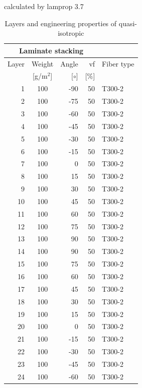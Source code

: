 \documentclass[a4paper,landscape,oneside,11pt,twocolumn]{memoir}
\begin{document}
\begin{table}[!htbp]
  \renewcommand{\arraystretch}{1.2}
  \caption{\label{tab:quasi-isotropic}Layers and engineering properties of quasi-isotropic}
  \centering\footnotesize{\rule{0pt}{10pt}
  \tiny calculated by lamprop 3.7\\[3pt]}
    \begin{tabular}[t]{rcrrl}
      \multicolumn{4}{c}{\small\textbf{Laminate stacking}}\\[0.1em]
      \toprule %
      Layer & Weight & Angle & vf & Fiber type\\
            & [g/m$^2$] & [$\circ$] & [\%]\\
      \midrule
      1 &  100 &   -90 & 50 & T300-2\\
      2 &  100 &   -75 & 50 & T300-2\\
      3 &  100 &   -60 & 50 & T300-2\\
      4 &  100 &   -45 & 50 & T300-2\\
      5 &  100 &   -30 & 50 & T300-2\\
      6 &  100 &   -15 & 50 & T300-2\\
      7 &  100 &     0 & 50 & T300-2\\
      8 &  100 &    15 & 50 & T300-2\\
      9 &  100 &    30 & 50 & T300-2\\
      10 &  100 &    45 & 50 & T300-2\\
      11 &  100 &    60 & 50 & T300-2\\
      12 &  100 &    75 & 50 & T300-2\\
      13 &  100 &    90 & 50 & T300-2\\
      14 &  100 &    90 & 50 & T300-2\\
      15 &  100 &    75 & 50 & T300-2\\
      16 &  100 &    60 & 50 & T300-2\\
      17 &  100 &    45 & 50 & T300-2\\
      18 &  100 &    30 & 50 & T300-2\\
      19 &  100 &    15 & 50 & T300-2\\
      20 &  100 &     0 & 50 & T300-2\\
      21 &  100 &   -15 & 50 & T300-2\\
      22 &  100 &   -30 & 50 & T300-2\\
      23 &  100 &   -45 & 50 & T300-2\\
      24 &  100 &   -60 & 50 & T300-2\\

\end{tabular}
\end{table}
\end{document}

